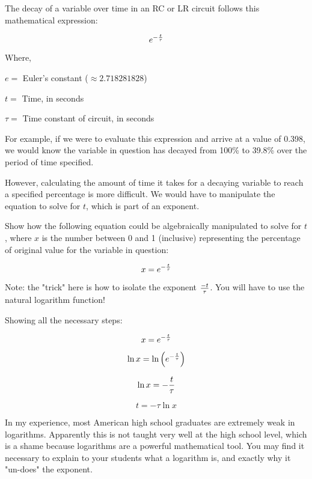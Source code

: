 

The decay of a variable over time in an RC or LR circuit follows this mathematical expression:

$$e^{-{t \over \tau}}$$

\noindent
Where,

$e =$ Euler's constant ($\approx 2.718281828$)

$t =$ Time, in seconds

$\tau =$ Time constant of circuit, in seconds

\vskip 10pt

For example, if we were to evaluate this expression and arrive at a value of 0.398, we would know the variable in question has decayed from 100\% to 39.8\% over the period of time specified.

However, calculating the amount of time it takes for a decaying variable to reach a specified percentage is more difficult.  We would have to manipulate the equation to solve for $t$, which is part of an exponent.

Show how the following equation could be algebraically manipulated to solve for $t$, where $x$ is the number between 0 and 1 (inclusive) representing the percentage of original value for the variable in question:

$$x = e^{-{t \over \tau}}$$

Note: the "trick" here is how to isolate the exponent $-t \over \tau$.  You will have to use the natural logarithm function!







Showing all the necessary steps:

$$x = e^{-{t \over \tau}}$$

$$\ln x = \ln \left( e^{-{t \over \tau}} \right)$$

$$\ln x = {-{t \over \tau}}$$

$$t = -\tau \ln x$$








In my experience, most American high school graduates are extremely weak in logarithms.  Apparently this is not taught very well at the high school level, which is a shame because logarithms are a powerful mathematical tool.  You may find it necessary to explain to your students what a logarithm is, and exactly why it "un-does" the exponent.

